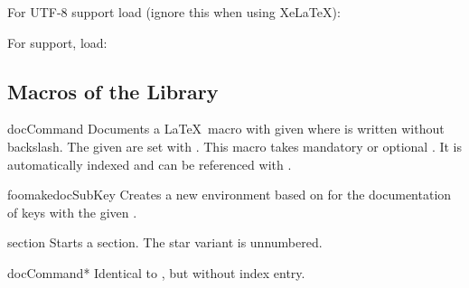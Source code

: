 For UTF-8 support load (ignore this when using Xe\LaTeX):
\begin{dispListing}
\end{dispListing}

For  \cite{poore:minted} support, load:
\begin{dispListing}
\end{dispListing}


\subsection{Macros of the Library}

\begin{docEnvironment}[doclang/environment content=command description,doc updated=2020-04-22]
    {docCommand}{}
  Documents a \LaTeX\ macro with given  where  is
  written without backslash. The given  are set with .
  This macro takes mandatory or optional .
  It is automatically indexed and can be referenced with
  .
\begin{dispExample}
\begin{docCommand}{foomakedocSubKey}{}
  Creates a new environment  based on  for the
  documentation of keys with the given .
\end{docCommand}
\end{dispExample}
\begin{dispExample}
\begin{docCommand}[doc no index,color definition=blue]{section}%
    {\sarg{}}
  Starts a section. The star variant is unnumbered.
\end{docCommand}
\end{dispExample}
\end{docEnvironment}


\begin{docEnvironment}[doclang/environment content=command description,doc updated=2020-04-22]
    {docCommand*}{}
  Identical to , but without index entry.
\end{docEnvironment}


